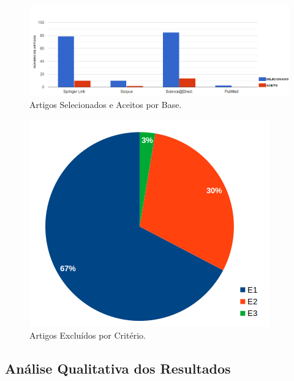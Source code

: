 \documentclass[12pt]{article}
\begin{document}
\begin{figure}[tb]
    \centering
    \includegraphics[scale=0.42]{figuras/_artigosAceitosSelecionados.png}
    \caption{Artigos Selecionados e Aceitos por Base.}\label{fig:artigoBases}
\end{figure}

\begin{figure}[tb]
    \centering
    \includegraphics[scale=0.5]{figuras/_artigosExcluidosPorCriterio.png}
    \caption{Artigos Excluídos por Critério.}\label{fig:excluidosCriterios}
\end{figure}


\subsection{Análise Qualitativa dos Resultados}
\end{document}
